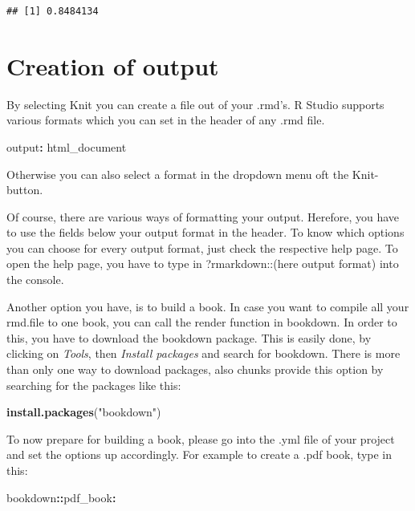 \documentclass[]{report}
\newenvironment{Shaded}{\begin{snugshade}}{\end{snugshade}}
\newcommand{\KeywordTok}[1]{\textcolor[rgb]{0.13,0.29,0.53}{\textbf{#1}}}
\newcommand{\StringTok}[1]{\textcolor[rgb]{0.31,0.60,0.02}{#1}}
\newcommand{\OperatorTok}[1]{\textcolor[rgb]{0.81,0.36,0.00}{\textbf{#1}}}
\newcommand{\NormalTok}[1]{#1}
\begin{document}
\begin{verbatim}
## [1] 0.8484134
\end{verbatim}

\chapter{Creation of output}\label{creation-of-output}

By selecting Knit you can create a file out of your .rmd's. R Studio
supports various formats which you can set in the header of any .rmd
file.

\begin{Shaded}
\begin{Highlighting}[]
\NormalTok{output}\OperatorTok{:}\StringTok{ }\NormalTok{html_document}
\end{Highlighting}
\end{Shaded}

Otherwise you can also select a format in the dropdown menu oft the
Knit-button.

Of course, there are various ways of formatting your output. Herefore,
you have to use the fields below your output format in the header. To
know which options you can choose for every output format, just check
the respective help page. To open the help page, you have to type in
?rmarkdown::(here output format) into the console.

Another option you have, is to build a book. In case you want to compile
all your rmd.file to one book, you can call the render function in
bookdown. In order to this, you have to download the bookdown package.
This is easily done, by clicking on \emph{Tools}, then \emph{Install
packages} and search for bookdown. There is more than only one way to
download packages, also chunks provide this option by searching for the
packages like this:

\begin{Shaded}
\begin{Highlighting}[]
\KeywordTok{install.packages}\NormalTok{(}\StringTok{"bookdown"}\NormalTok{)}
\end{Highlighting}
\end{Shaded}

To now prepare for building a book, please go into the .yml file of your
project and set the options up accordingly. For example to create a .pdf
book, type in this:

\begin{Shaded}
\begin{Highlighting}[]
\NormalTok{bookdown}\OperatorTok{::}\NormalTok{pdf_book}\OperatorTok{:}
\end{Highlighting}
\end{Shaded}
\end{document}
